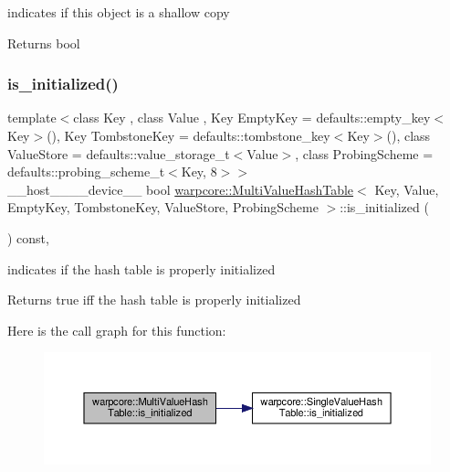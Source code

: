 indicates if this object is a shallow copy 

\begin{DoxyReturn}{Returns}
{\ttfamily bool} 
\end{DoxyReturn}
\mbox{\label{classwarpcore_1_1MultiValueHashTable_a206e52ad175b2d6d7abbaae25fa19c7f}} 
\subsubsection{\texorpdfstring{is\+\_\+initialized()}{is\_initialized()}}
{\footnotesize\ttfamily template$<$class Key , class Value , Key Empty\+Key = defaults\+::empty\+\_\+key$<$\+Key$>$(), Key Tombstone\+Key = defaults\+::tombstone\+\_\+key$<$\+Key$>$(), class Value\+Store  = defaults\+::value\+\_\+storage\+\_\+t$<$\+Value$>$, class Probing\+Scheme  = defaults\+::probing\+\_\+scheme\+\_\+t$<$\+Key, 8$>$$>$ \\
\+\_\+\+\_\+host\+\_\+\+\_\+\+\_\+\+\_\+device\+\_\+\+\_\+ bool \hyperlink{classwarpcore_1_1MultiValueHashTable}{warpcore\+::\+Multi\+Value\+Hash\+Table}$<$ Key, Value, Empty\+Key, Tombstone\+Key, Value\+Store, Probing\+Scheme $>$\+::is\+\_\+initialized (\begin{DoxyParamCaption}{ }\end{DoxyParamCaption}) const\hspace{0.3cm}{\ttfamily [inline]}, {\ttfamily [noexcept]}}



indicates if the hash table is properly initialized 

\begin{DoxyReturn}{Returns}
{\ttfamily true} iff the hash table is properly initialized 
\end{DoxyReturn}
Here is the call graph for this function\+:
\nopagebreak
\begin{figure}[H]
\begin{center}
\leavevmode
\includegraphics[width=350pt]{classwarpcore_1_1MultiValueHashTable_a206e52ad175b2d6d7abbaae25fa19c7f_cgraph}
\end{center}
\end{figure}
\mbox{\label{classwarpcore_1_1MultiValueHashTable_a65e099a2eea8ca9b800d02937b6c66a8}} 
